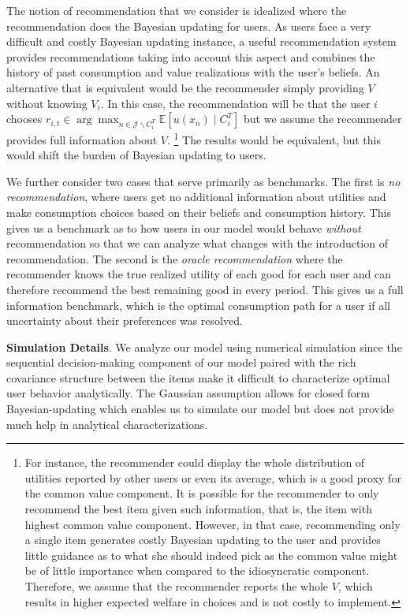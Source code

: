 \documentclass[sigconf]{acmart}
\begin{document}
The notion of recommendation that we consider is idealized where the recommendation does the Bayesian updating for users. As users face a very difficult and costly Bayesian updating instance, a useful recommendation system provides recommendations taking into account this aspect and combines the history of past consumption and value realizations with the user's beliefs. 
An alternative that is equivalent would be the recommender simply providing $V$ without knowing $V_i$. In this case, the recommendation will be that the user $i$ chooses $r_{i,t} \in \arg \max_{n\in \mathcal J\backslash C^T_i} \mathbb E[u(x_n) \mid C_i^T]$
but we assume the recommender provides full information about $V$. \footnote{For instance, the recommender could display the whole distribution of utilities reported by other users or even its average, which is a good proxy for the common value component. It is possible for the recommender to only recommend the best item given such information, that is, the item with highest common value component. However, in that case, recommending only a single item generates costly Bayesian updating to the user and provides little guidance as to what she should indeed pick as the common value might be of little importance when compared to the idiosyncratic component. Therefore, we assume that the recommender reports the whole $V$, which results in higher expected welfare in choices and is not costly to implement.}
The results would be equivalent, but this would shift the burden of Bayesian updating to users.
\par

We further consider two cases that serve primarily as benchmarks. The first is \textit{no recommendation}, where users get no additional information about utilities and make consumption choices based on their beliefs and consumption history. This gives us a benchmark as to how users in our model would behave \textit{without} recommendation so that we can analyze what changes with the introduction of recommendation. The second is the \textit{oracle recommendation} where the recommender knows the true realized utility of each good for each user and can therefore recommend the best remaining good in every period. This gives us a full information benchmark, which is the optimal consumption path for a user if all uncertainty about their preferences was resolved.
\par

\noindent \textbf{Simulation Details}. 
We analyze our model using numerical simulation since the sequential decision-making component of our model paired with the rich covariance structure between the items make it difficult to characterize optimal user behavior analytically. The Gaussian assumption allows for closed form Bayesian-updating which enables us to simulate our model but does not provide much help in analytical characterizations. 
\par
\end{document}

